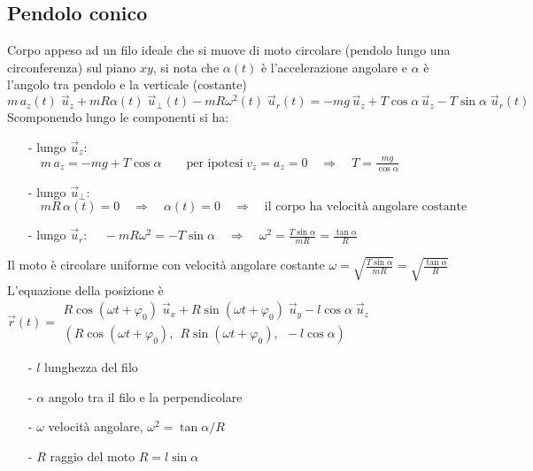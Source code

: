 \documentclass[a4paper]{article}
\newcommand\ux{\vec{u}_x}
\newcommand\uy{\vec{u}_y}
\newcommand\uz{\vec{u}_z}
\newcommand\ur{\vec{u}_r}
\newcommand\uper{\vec{u}_\perp}
\begin{document}
\subsection{Pendolo conico}
Corpo appeso ad un filo ideale che si muove di moto circolare (pendolo lungo una circonferenza) sul piano \(xy\), si nota che
\(\alpha(t)\) è l'accelerazione angolare e \(\alpha\) è l'angolo tra pendolo e la verticale (costante)
\[m \, a_z(t) \; \uz + mR\alpha(t)\;\uper(t) - mR\omega^2(t) \; \ur(t) = - mg \, \uz + T \cos \alpha \, \uz - T \sin \alpha \; \ur(t)\]
Scomponendo lungo le componenti si ha:
\begin{itemize}[topsep=3pt, itemsep=0pt]
	\item[-] lungo \(\uz\): \(\displaystyle \quad m \, a_z = -mg + T \cos \alpha \qquad \text{per ipotesi} \; v_z = a_z = 0 \quad \Rightarrow \quad T = \frac{mg}{\cos \alpha}\)
	\item[-] lungo \(\uper\): \(\displaystyle \quad mR \, \alpha(t) = 0 \quad \Rightarrow \quad \alpha(t) = 0 \quad \Rightarrow \quad \text{il corpo ha velocità angolare costante}\)
	\item[-] lungo \(\ur\): \(\displaystyle \quad -mR \omega^2 = -T \sin \alpha \quad \Rightarrow \quad \omega^2 = \frac{T \sin \alpha}{mR} = \frac{\tan \alpha}{R}\)
\end{itemize}
Il moto è circolare uniforme con velocità angolare costante \(\displaystyle \omega = \sqrt{\frac{T \sin \alpha}{mR}} = \sqrt{\frac{\tan \alpha}{R}}\) \\
L'equazione della posizione è \(\displaystyle \vec{r}(t) = \begin{array}{l} R \cos (\omega t + \varphi_0) \; \ux + R \sin (\omega t + \varphi_0) \; \uy - l \cos \alpha \; \uz \\ (R \cos (\omega t + \varphi_0), \;\, R \sin (\omega t + \varphi_0),\;\, -l\cos \alpha)\end{array}\)
\begin{itemize}[topsep=3pt, itemsep=0pt]
	\item[-] \(l\) lunghezza del filo
	\item[-] \(\alpha\) angolo tra il filo e la perpendicolare
	\item[-] \(\omega\) velocità angolare, \(\omega^2 = \tan \alpha / R\)
	\item[-] \(R\) raggio del moto \(R = l \sin \alpha\)
\end{itemize}

\newpage
\end{document}
